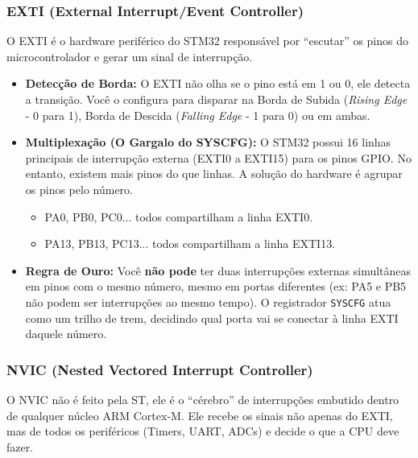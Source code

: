 \documentclass[12pt,a4paper]{article}
\begin{document}
\subsubsection{EXTI (External Interrupt/Event Controller)}
O EXTI é o hardware periférico do STM32 responsável por ``escutar'' os pinos do microcontrolador e gerar um sinal de interrupção.
\begin{itemize}
    \item \textbf{Detecção de Borda:} O EXTI não olha se o pino está em 1 ou 0, ele detecta a transição. Você o configura para disparar na Borda de Subida (\textit{Rising Edge} - 0 para 1), Borda de Descida (\textit{Falling Edge} - 1 para 0) ou em ambas.
    \item \textbf{Multiplexação (O Gargalo do SYSCFG):} O STM32 possui 16 linhas principais de interrupção externa (EXTI0 a EXTI15) para os pinos GPIO. No entanto, existem mais pinos do que linhas. A solução do hardware é agrupar os pinos pelo número.
    \begin{itemize}
        \item PA0, PB0, PC0... todos compartilham a linha EXTI0.
        \item PA13, PB13, PC13... todos compartilham a linha EXTI13.
    \end{itemize}
    \item \textbf{Regra de Ouro:} Você \textbf{não pode} ter duas interrupções externas simultâneas em pinos com o mesmo número, mesmo em portas diferentes (ex: PA5 e PB5 não podem ser interrupções ao mesmo tempo). O registrador \texttt{SYSCFG} atua como um trilho de trem, decidindo qual porta vai se conectar à linha EXTI daquele número.
\end{itemize}

\subsubsection{NVIC (Nested Vectored Interrupt Controller)}
O NVIC não é feito pela ST, ele é o ``cérebro'' de interrupções embutido dentro de qualquer núcleo ARM Cortex-M. Ele recebe os sinais não apenas do EXTI, mas de todos os periféricos (Timers, UART, ADCs) e decide o que a CPU deve fazer.
\end{document}
